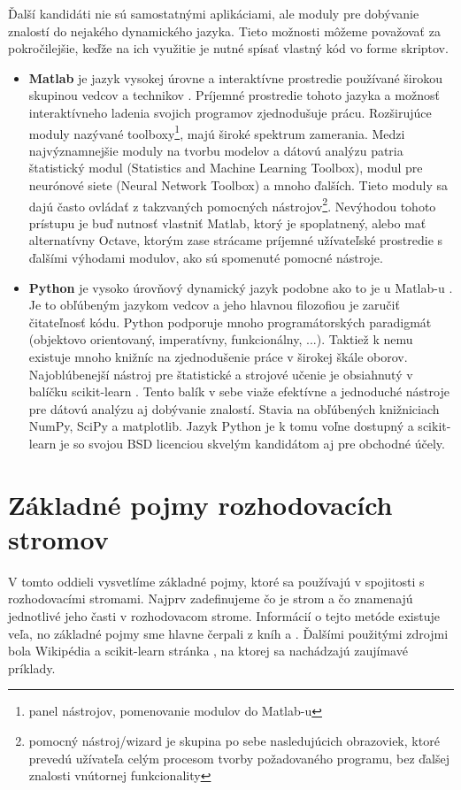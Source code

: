 Ďalší kandidáti nie sú samostatnými aplikáciami, ale moduly pre dobývanie znalostí do nejakého dynamického jazyka. Tieto možnosti môžeme považovať za pokročilejšie, keďže na ich využitie je nutné spísať vlastný kód vo forme skriptov.
\begin{itemize}
\item \textbf{Matlab} je jazyk vysokej úrovne a interaktívne prostredie používané širokou skupinou vedcov a technikov \cite{online-DataMiningMatlab}. Príjemné prostredie tohoto jazyka a možnosť interaktívneho ladenia svojich programov zjednodušuje prácu. Rozširujúce moduly nazývané toolboxy\footnote{panel nástrojov, pomenovanie modulov do Matlab-u}, majú široké spektrum zamerania. Medzi najvýznamnejšie moduly na tvorbu modelov a dátovú analýzu pat\-ria štatistický modul (Statistics and Machine Learning Toolbox), modul pre neu\-rónové siete (Neural Network Toolbox) a mnoho ďalších. Tieto moduly sa dajú často ovládať z takzvaných pomocných nástrojov\footnote{pomocný nástroj/wizard je skupina po sebe nasledujúcich obrazoviek, ktoré prevedú užívateľa celým procesom tvorby požadovaného programu, bez ďalšej znalosti vnútornej funkcionality}.
Nevýhodou tohoto prístupu je buď nutnosť vlastniť Matlab, ktorý je spoplatnený, alebo mať alternatívny Octave, ktorým zase strácame príjemné užívateľské prostredie s ďalšími výhodami modulov, ako sú spomenuté pomocné nástroje.
\item \textbf{Python} je vysoko úrovňový dynamický jazyk podobne ako to je u Matlab-u \cite{wiki-Python}. Je to obľúbeným jazykom vedcov a jeho hlavnou filozofiou je zaručiť čitateľnosť kódu. Python podporuje mnoho programátorských paradigmát (objektovo orientovaný, imperatívny, funkcionálny, ...). Taktiež k nemu existuje mnoho knižníc na zjednodušenie práce v širokej škále oborov. Najoblúbenejší nástroj pre štatistické a strojové učenie je obsiahnutý v balíčku scikit-learn \cite{kap1-Scikit}. Tento balík v sebe viaže efektívne a jednoduché nástroje pre dátovú analýzu aj dobývanie znalostí. Stavia na obľúbených knižniciach NumPy, SciPy a matplotlib. Jazyk Python je k tomu voľne dostupný a scikit-learn je so svojou BSD licenciou skvelým kandidátom aj pre obchodné účely. 
\end{itemize}

\section{Základné pojmy rozhodovacích stromov}\label{kap1:2.3:DT}
V tomto oddieli vysvetlíme základné pojmy, ktoré sa používajú v spojitosti s rozhodovacími stromami. Najprv zadefinujeme čo je strom a čo znamenajú jednotlivé jeho časti v rozhodovacom strome. Informácií o tejto metóde existuje veľa, no základné pojmy sme hlavne čerpali z kníh \cite{kap1-DataMiningForTrees,kap1-DecisionTree} a \cite[s. 481-498]{kap1-DataMiningAndAnalysis}. Ďalšími použitými zdrojmi bola Wikipédia \cite{wiki-DecisionTree} a scikit-learn stránka \cite{online-DecisionTreeScikit}, na ktorej sa nachádzajú zaujímavé príklady.

